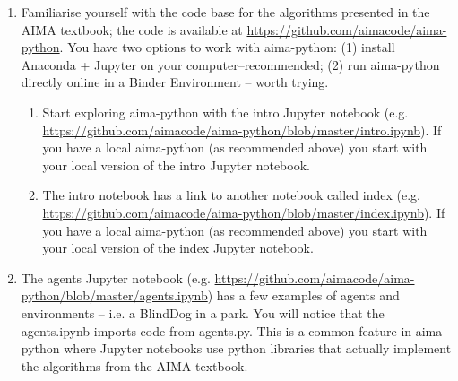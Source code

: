 \documentclass[11pt]{article}
\newcommand{\question}[1]{#1}
\newcommand{\answer}[1]{}
\begin{document}
\begin{enumerate}

\item 
\question{Familiarise yourself with the code base for the algorithms presented in the AIMA textbook; the code is available at \url{https://github.com/aimacode/aima-python}. You have two options to work with aima-python: (1) install Anaconda + Jupyter on your computer--recommended; (2) run aima-python directly online in a Binder Environment – worth trying.

\begin{enumerate}
\item Start exploring aima-python with the intro Jupyter notebook (e.g. \url{https://github.com/aimacode/aima-python/blob/master/intro.ipynb}). If you have a local aima-python (as recommended above) you start with your local version of the intro Jupyter notebook.
\item The intro notebook has a link to another notebook called index (e.g. \url{https://github.com/aimacode/aima-python/blob/master/index.ipynb}). If you have a local aima-python (as recommended above) you start with your local version of the index Jupyter notebook.
\end{enumerate}
}
\answer{Follow the instructions in the aima-python code repository.}

\item 
\question{The agents Jupyter notebook (e.g. \url{https://github.com/aimacode/aima-python/blob/master/agents.ipynb}) has a few examples of agents and environments – i.e. a BlindDog in a park. You will notice that the agents.ipynb imports code from agents.py. This is a common feature in aima-python where Jupyter notebooks use python libraries that actually implement the algorithms from the AIMA textbook.

}
\end{enumerate}
\end{document}
